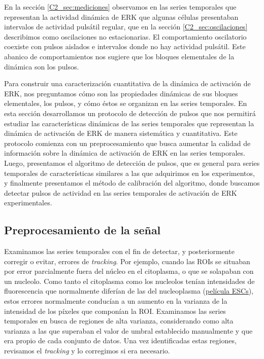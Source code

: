 \documentclass[./main.tex]{subfiles}
\begin{document}
En la sección \ref{C2_sec:mediciones} observamos en las series temporales que representan la actividad dinámica de ERK que algunas células presentaban intervalos de actividad pulsátil regular, que en la sección \ref{C2_sec:oscilaciones} describimos como oscilaciones no estacionarias. El comportamiento oscilatorio coexiste con pulsos aislados e intervalos donde no hay actividad pulsátil. Este abanico de comportamientos nos sugiere que los bloques elementales de la dinámica son los pulsos. 

Para construir una caracterización cuantitativa de la dinámica de activación de ERK, nos preguntamos cómo son las propiedades dinámicas de sus bloques elementales, los pulsos, y cómo éstos se organizan en las series temporales. En esta sección desarrollamos un protocolo de detección de pulsos que nos permitirá estudiar las características dinámicas de las series temporales que representan la dinámica de activación de ERK de manera sistemática y cuantitativa. Este protocolo comienza con un preprocesamiento que busca aumentar la calidad de información sobre la dinámica de activación de ERK en las series temporales. Luego, presentamos el algoritmo de detección de pulsos, que es general para series temporales de características similares a las que adquirimos en los experimentos, y finalmente presentamos el método de calibración del algoritmo, donde buscamos detectar pulsos de actividad en las series temporales de activación de ERK experimentales. 


\subsection{Preprocesamiento de la señal}


Examinamos las series temporales con el fin de detectar, y posteriormente corregir o evitar, errores de \textit{tracking}. Por ejemplo, cuando las ROIs se situaban por error parcialmente fuera del núcleo en el citoplasma, o que se solapaban con un nucleolo. Como tanto el citoplasma como los nucleolos tenían intensidades de fluorescencia que normalmente diferían de las del nucleoplasma (\href{http://movie.biologists.com/video/10.1242/dev.199710/video-1}{\underline{película ESCs}}), estos errores normalmente conducían a un aumento en la varianza de la intensidad de los píxeles que componían la ROI. Examinamos las series temporales en busca de regiones de alta varianza, considerando como alta varianza a las que superaban el valor de umbral establecido manualmente y que era propio de cada conjunto de datos. Una vez identificadas estas regiones, revisamos el \textit{tracking} y lo corregimos si era necesario.
\end{document}

